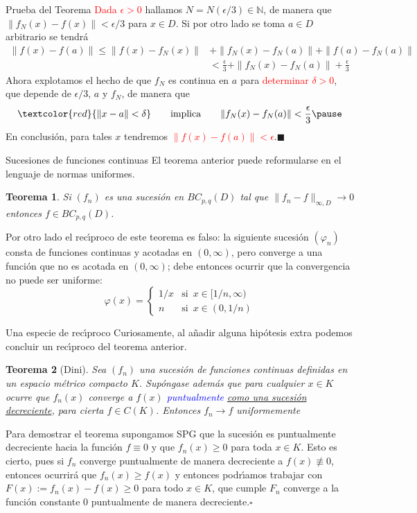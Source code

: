 \documentclass[xcolor=dvipsnames,10pt,handout, draft]{beamer}
\newcommand{\nz}{\mathbb N}
\newtheorem*{teo}{Teorema}
\begin{document}
\begin{frame}{Prueba del Teorema}
\textcolor{red}{Dada $\epsilon>0$} hallamos $N=N(\epsilon/3)\in\nz$, de manera que $\|f_N(x)-f(x)\|<\epsilon/3$ para $x\in D$. \pause Si por otro lado se toma $a\in D$ arbitrario se tendr\'a
\begin{align*}
\|f(x)-f(a)\|\leq\|f(x)-f_N(x)\|&+\|f_N(x)-f_N(a)\|+\|f(a)-f_N(a)\|\\
&<\frac{\epsilon}{3}+\|f_N(x)-f_N(a)\|+\frac{\epsilon}{3}
\end{align*}\pause
Ahora explotamos el hecho de que $f_N$ es continua en $a$ para \textcolor{red}{determinar $\delta>0$}, que depende de $\epsilon/3$, $a$ y $f_N$, de manera que 
$$\textcolor{red}{\|x-a\|<\delta}\qquad\text{implica}\qquad\|f_N(x)-f_N(a)\|<\frac{\epsilon}{3}\pause$$
En conclusi\'on, para tales $x$ tendremos \textcolor{red}{$\|f(x)-f(a)\|<\epsilon$}.\hfill$\blacksquare$
\end{frame}

\begin{frame}{Sucesiones de funciones continuas}
El teorema anterior puede reformularse en el lenguaje de normas uniformes.\pause
\begin{teo}
Si $(f_n)$ es una sucesi\'on en $BC_{p,q}(D)$ tal que $\|f_n-f\|_{\infty,D}\to0$ entonces $f\in BC_{p,q}(D)$.\pause
\end{teo}

Por otro lado el rec\'\i proco de este teorema es falso: la siguiente sucesi\'on $(\varphi_n)$ consta de funciones continuas y acotadas en $(0,\infty)$, pero converge a una funci\'on que no es acotada en $(0,\infty)$; \pause debe entonces ocurrir que la convergencia no puede ser uniforme:
$$\varphi(x)=\left\{\begin{array}{ll}
				1/x&\text{si }\,x\in[1/n,\infty)\\
				n&\text{si }\,x\in(0,1/n)
			\end{array}\right.$$
\end{frame}

\begin{frame}{Una especie de rec\'\i proco}
Curiosamente, al a\~nadir alguna hip\'otesis extra podemos concluir un rec\'\i proco del teorema anterior.\pause

\begin{teo}[Dini]
Sea $(f_n)$ una sucesi\'on de funciones continuas definidas en un espacio m\'etrico compacto $K$. \pause Sup\'ongase adem\'as que para cualquier $x\in K$ ocurre que $f_n(x)$ converge a $f(x)$ \textcolor{blue}{puntualmente} \underline{como una sucesi\'on decreciente}, para cierta $f\in C(K)$. Entonces $f_n\to f$ uniformemente\pause
\end{teo}
Para demostrar el teorema supongamos SPG que la sucesi\'on es puntualmente decreciente hacia la funci\'on $f\equiv0$ y que $f_n(x)\geq0$ para toda $x\in K$.
\pause\vskip6pt
Esto es cierto, pues si $f_n$ converge puntualmente de manera decreciente a $f(x)\not\equiv0$, entonces ocurrir\'a que $f_n(x)\geq f(x)$ y entonces podr\'\i amos trabajar con $F(x):=f_n(x)-f(x)\geq 0$ para todo $x\in K$, \pause que cumple $F_n$ converge a la funci\'on constante $0$ puntualmente de manera decreciente.\hfill$\square$
\end{frame}
\end{document}
